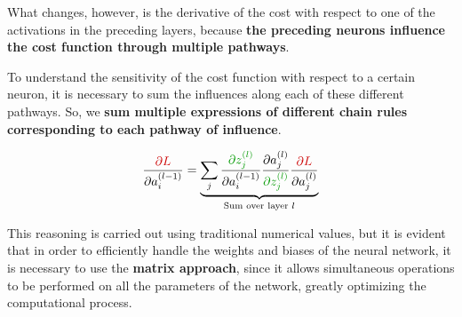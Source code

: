 What changes, however, is the derivative of the cost with respect to one of the activations in the preceding layers, because \textbf{the preceding neurons influence the cost function through multiple pathways}.

To understand the sensitivity of the cost function with respect to a certain neuron, it is necessary to sum the influences along each of these different pathways. So, we \textbf{sum multiple expressions of different chain rules corresponding to each pathway of influence}.

\vspace{-0.5cm}
$$\frac{\textcolor{myred}{\partial L}}{\partial a_{i}^{(l-1)}} = \underbrace{\sum_{j}\frac{\textcolor{mygreen}{\partial z_{j}^{(l)}}}{\partial a_{i}^{(l-1)}}  \frac{\partial a_{j}^{(l)}}{\textcolor{mygreen}{\partial z_{j}^{(l)}}} \frac{\textcolor{myred}{\partial L}}{\partial a_{j}^{(l)}}}_\textrm{Sum over layer $l$}$$

This reasoning is carried out using traditional numerical values, but it is evident that in order to efficiently handle the weights and biases of the neural network, it is necessary to use the \textbf{matrix approach}, since it allows simultaneous operations to be performed on all the parameters of the network, greatly optimizing the computational process.
